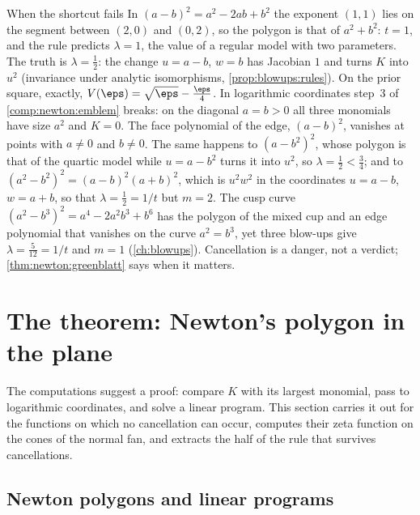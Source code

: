 \begin{refsection}
\begin{computation}{When the shortcut fails}\label{comp:newton:degenerate}
\step In $(a-b)^2=a^2-2ab+b^2$ the exponent $(1,1)$ lies on the segment between $(2,0)$ and $(0,2)$, so the polygon is that of $a^2+b^2$: $t=1$, and the rule predicts $\lambda=1$, the value of a regular model with two parameters.
\step The truth is $\lambda=\frac12$: the change $u=a-b$, $w=b$ has Jacobian $1$ and turns $K$ into $u^2$ (invariance under analytic isomorphisms, \cref{prop:blowups:rules}). On the prior square, exactly, $V(\eps)=\sqrt\eps-\frac\eps4$.
\step In logarithmic coordinates step~3 of \cref{comp:newton:emblem} breaks: on the diagonal $a=b>0$ all three monomials have size $a^2$ and $K=0$. The face polynomial of the edge, $(a-b)^2$, vanishes at points with $a\ne0$ and $b\ne0$.
\step The same happens to $(a-b^2)^2$, whose polygon is that of the quartic model while $u=a-b^2$ turns it into $u^2$, so $\lambda=\frac12<\frac34$; and to $(a^2-b^2)^2=(a-b)^2(a+b)^2$, which is $u^2w^2$ in the coordinates $u=a-b$, $w=a+b$, so that $\lambda=\frac12=1/t$ but $m=2$. The cusp curve $(a^2-b^3)^2=a^4-2a^2b^3+b^6$ has the polygon of the mixed cup and an edge polynomial that vanishes on the curve $a^2=b^3$, yet three blow-ups give $\lambda=\frac5{12}=1/t$ and $m=1$ (\cref{ch:blowups}). Cancellation is a danger, not a verdict; \cref{thm:newton:greenblatt} says when it matters.
\end{computation}

\section{The theorem: Newton's polygon in the plane}\label{sec:newton:theorem}

The computations suggest a proof: compare $K$ with its largest monomial, pass to logarithmic coordinates, and solve a linear program. This section carries it out for the functions on which no cancellation can occur, computes their zeta function on the cones of the normal fan, and extracts the half of the rule that survives cancellations.

\subsection{Newton polygons and linear programs}


\end{refsection}
